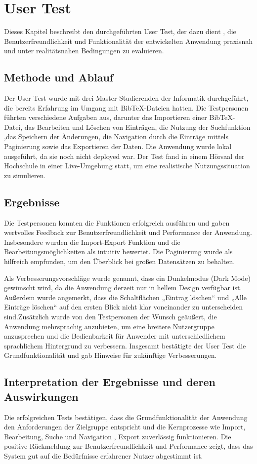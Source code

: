 \chapter{User Test}
Dieses Kapitel beschreibt den durchgeführten User Test, der dazu dient ,
die Benutzerfreundlichkeit und Funktionalität der entwickelten Anwendung praxisnah und unter
realitätsnahen Bedingungen zu evaluieren.

\section{Methode und Ablauf}
Der User Test wurde mit drei Master-Studierenden der Informatik durchgeführt, 
die bereits Erfahrung im Umgang mit BibTeX-Dateien hatten. Die Testpersonen führten verschiedene Aufgaben aus,
darunter das Importieren einer BibTeX-Datei, das Bearbeiten und Löschen von Einträgen,
die Nutzung der Suchfunktion ,das Speichern der Änderungen, die Navigation  durch die Einträge mittels Paginierung 
sowie das Exportieren der Daten.
Die Anwendung wurde lokal ausgeführt, da sie noch nicht deployed war. Der Test fand in einem Hörsaal
der Hochschule in einer Live-Umgebung statt, um eine realistische Nutzungssituation zu simulieren.

\section{Ergebnisse}
Die Testpersonen konnten die Funktionen erfolgreich ausführen und gaben wertvolles Feedback zur
Benutzerfreundlichkeit und Performance der Anwendung. Insbesondere wurden die Import-Export Funktion und
die Bearbeitungsmöglichkeiten als intuitiv bewertet. Die Paginierung wurde als hilfreich empfunden, um den 
Überblick bei großen Datensätzen zu behalten.

Als Verbesserungsvorschläge wurde genannt, dass ein Dunkelmodus (Dark Mode) gewünscht wird, 
da die Anwendung derzeit nur in hellem Design verfügbar ist. Außerdem wurde angemerkt, 
dass die Schaltflächen „Eintrag löschen“ und „Alle Einträge löschen“ auf den ersten Blick nicht klar voneinander 
zu unterscheiden sind.Zusätzlich wurde von den Testpersonen der Wunsch geäußert, die Anwendung mehrsprachig anzubieten,
um eine breitere Nutzergruppe anzusprechen und die Bedienbarkeit für Anwender mit unterschiedlichem sprachlichem Hintergrund
zu verbessern. Insgesamt bestätigte der User Test die Grundfunktionalität und gab Hinweise für zukünftige Verbesserungen.

\section{Interpretation der Ergebnisse und deren Auswirkungen}
Die erfolgreichen Tests bestätigen, dass die Grundfunktionalität der Anwendung den Anforderungen der Zielgruppe entspricht
und die Kernprozesse wie Import, Bearbeitung, Suche und Navigation , Export zuverlässig funktionieren. Die positive Rückmeldung zur
Benutzerfreundlichkeit und Performance zeigt, dass das System gut auf die Bedürfnisse erfahrener Nutzer abgestimmt ist.

